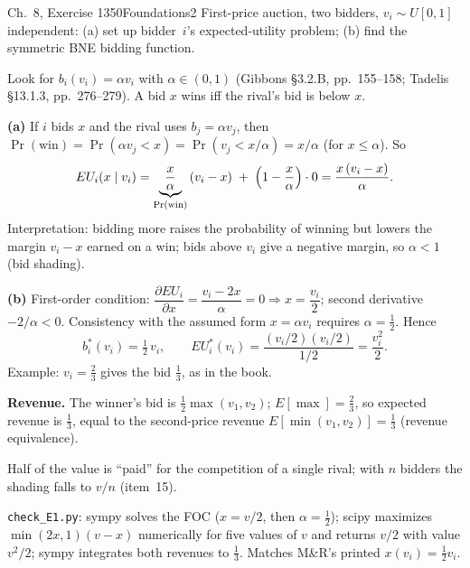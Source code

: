 \begin{exsol}{\MG{} Ch.~8, Exercise 1}{350}{Foundations}{2}
\asked First-price auction, two bidders, $v_i\sim U[0,1]$ independent: (a) set up bidder~$i$'s
expected-utility problem; (b) find the symmetric BNE bidding function.

\method Look for $b_i(v_i)=\alpha v_i$ with $\alpha\in(0,1)$ (Gibbons \S3.2.B, pp.~155--158;
Tadelis \S13.1.3, pp.~276--279). A bid $x$ wins iff the rival's bid is below $x$.

\solution
\textbf{(a)} If $i$ bids $x$ and the rival uses $b_j=\alpha v_j$, then
$\Pr(\text{win})=\Pr(\alpha v_j<x)=\Pr(v_j<x/\alpha)=x/\alpha$ (for $x\le\alpha$). So
\[
  EU_i(x\mid v_i)=\underbrace{\frac{x}{\alpha}}_{\Pr(\text{win})}\,(v_i-x)\;+\;\Bigl(1-\frac{x}{\alpha}\Bigr)\cdot 0
  =\frac{x\,(v_i-x)}{\alpha}.
\]
Interpretation: bidding more raises the probability of winning but lowers the margin $v_i-x$
earned on a win; bids above $v_i$ give a negative margin, so $\alpha<1$ (bid shading).

\textbf{(b)} First-order condition: $\dfrac{\partial EU_i}{\partial x}=\dfrac{v_i-2x}{\alpha}=0\Rightarrow
x=\dfrac{v_i}{2}$; second derivative $-2/\alpha<0$. Consistency with the assumed form
$x=\alpha v_i$ requires $\alpha=\tfrac12$. Hence
\[
  b_i^*(v_i)=\tfrac12\,v_i,\qquad EU_i^*(v_i)=\frac{(v_i/2)(v_i/2)}{1/2}=\frac{v_i^2}{2}.
\]
Example: $v_i=\tfrac23$ gives the bid $\tfrac13$, as in the book.

\textbf{Revenue.} The winner's bid is $\tfrac12\max(v_1,v_2)$; $E[\max]=\tfrac23$, so expected
revenue is $\tfrac13$, equal to the second-price revenue $E[\min(v_1,v_2)]=\tfrac13$ (revenue
equivalence).

\interp Half of the value is ``paid'' for the competition of a single rival; with $n$ bidders the
shading falls to $v/n$ (item~15).

\verify \texttt{check\_E1.py}: sympy solves the FOC ($x=v/2$, then $\alpha=\tfrac12$); scipy
maximizes $\min(2x,1)(v-x)$ numerically for five values of $v$ and returns $v/2$ with value $v^2/2$;
sympy integrates both revenues to $\tfrac13$. Matches M\&R's printed $x(v_i)=\tfrac12v_i$.

\end{exsol}
